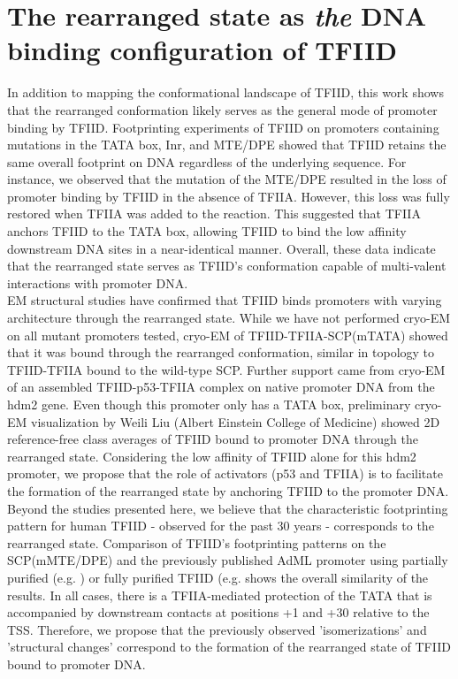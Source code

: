 \section{The rearranged state as \emph{the} DNA binding configuration of TFIID}

In addition to mapping the conformational landscape of TFIID, this work shows that the rearranged conformation likely serves as the general mode of promoter binding by TFIID. Footprinting experiments of TFIID on promoters containing mutations in the TATA box, Inr, and MTE/DPE showed that TFIID retains the same overall footprint on DNA regardless of the underlying sequence. For instance, we observed that the mutation of the MTE/DPE resulted in the loss of promoter binding by TFIID in the absence of TFIIA. However, this loss was fully restored when TFIIA was added to the reaction. This suggested that TFIIA anchors TFIID to the TATA box, allowing TFIID to bind the low affinity downstream DNA sites in a near-identical manner. Overall, these data indicate that the rearranged state serves as TFIID's conformation capable of multi-valent interactions with promoter DNA.\\
\indent EM structural studies have confirmed that TFIID binds promoters with varying architecture through the rearranged state. While we have not performed cryo-EM on all mutant promoters tested, cryo-EM of TFIID-TFIIA-SCP(mTATA) showed that it was bound through the rearranged conformation, similar in topology to TFIID-TFIIA bound to the wild-type SCP. Further support came from cryo-EM of an assembled TFIID-p53-TFIIA complex on native promoter DNA from the hdm2 gene. Even though this promoter only has a TATA box, preliminary cryo-EM visualization by Weili Liu (Albert Einstein College of Medicine) showed 2D reference-free class averages of TFIID bound to promoter DNA through the rearranged state. Considering the low affinity of TFIID alone for this hdm2 promoter, we propose that the role of activators (p53 and TFIIA) is to facilitate the formation of the rearranged state by anchoring TFIID to the promoter DNA. \\    
\indent Beyond the studies presented here, we believe that the characteristic footprinting pattern for human TFIID - observed for the past 30 years - corresponds to the rearranged state. Comparison of TFIID's footprinting patterns on the SCP(mMTE/DPE) and the previously published AdML promoter using partially purified (e.g. \cite{Sawadogo_3840,Va_3783}) or fully purified TFIID (e.g. \cite{Burke_3081,Chi_3023,Oelgeschlager_2880,Yakovchuk_306} shows the overall similarity of the results. In all cases, there is a TFIIA-mediated protection of the TATA that is accompanied by downstream contacts at positions +1 and +30 relative to the TSS. Therefore, we propose that the previously observed 'isomerizations' and 'structural changes' correspond to the formation of the rearranged state of TFIID bound to promoter DNA. \\
